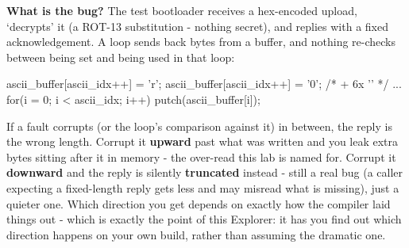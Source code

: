 \documentclass[11pt,letterpaper]{article}
\begin{document}
\vspace{4pt}


\guidelegend

\vspace{4pt}


\clearpage

\tableofcontents

\clearpage


\textbf{What is the bug?} The test bootloader receives a hex-encoded upload, `decrypts' it (a ROT-13 substitution -
nothing secret), and replies with a fixed acknowledgement. A loop sends back  bytes from a buffer,
and nothing re-checks  between being set and being used in that loop:

\begin{guidecode}
ascii_buffer[ascii_idx++] = 'r'; ascii_buffer[ascii_idx++] = '0';   /* + 6x '\n' */
...
for(i = 0; i < ascii_idx; i++)
    putch(ascii_buffer[i]);
\end{guidecode}

If a fault corrupts  (or the loop's comparison against it) in between, the reply is the wrong length.
Corrupt it \textbf{upward} past what was written and you leak extra bytes sitting after it in memory - the over-read
this lab is named for. Corrupt it \textbf{downward} and the reply is silently \textbf{truncated} instead - still a
real bug (a caller expecting a fixed-length reply gets less and may misread what is missing), just a quieter one.
Which direction you get depends on exactly how the compiler laid things out - which is exactly the point of this
Explorer: it has you find out which direction happens on your own build, rather than assuming the dramatic one.

\end{document}
